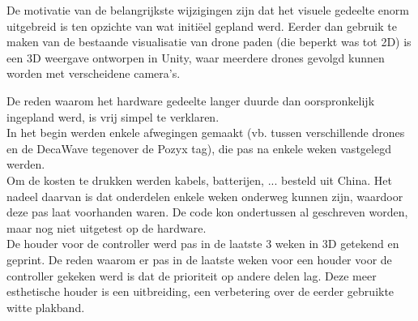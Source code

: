 De motivatie van de belangrijkste wijzigingen zijn dat het visuele gedeelte enorm uitgebreid is ten opzichte van wat initi\"eel gepland werd.
Eerder dan gebruik te maken van de bestaande visualisatie van drone paden (die beperkt was tot 2D) is een 3D weergave ontworpen in Unity, waar meerdere drones gevolgd kunnen worden met verscheidene camera's.

De reden waarom het hardware gedeelte langer duurde dan oorspronkelijk ingepland werd, is vrij simpel te verklaren.\\
In het begin werden enkele afwegingen gemaakt (vb. tussen verschillende drones en de DecaWave tegenover de Pozyx tag), die pas na enkele weken vastgelegd werden.\\
Om de kosten te drukken werden kabels, batterijen, ... besteld uit China.
Het nadeel daarvan is dat onderdelen enkele weken onderweg kunnen zijn, waardoor deze pas laat voorhanden waren.
De code kon ondertussen al geschreven worden, maar nog niet uitgetest op de hardware.\\
De houder voor de controller werd pas in de laatste 3 weken in 3D getekend en geprint.
De reden waarom er pas in de laatste weken voor een houder voor de controller gekeken werd is dat de prioriteit op andere delen lag.
Deze meer esthetische houder is een uitbreiding, een verbetering over de eerder gebruikte witte plakband.